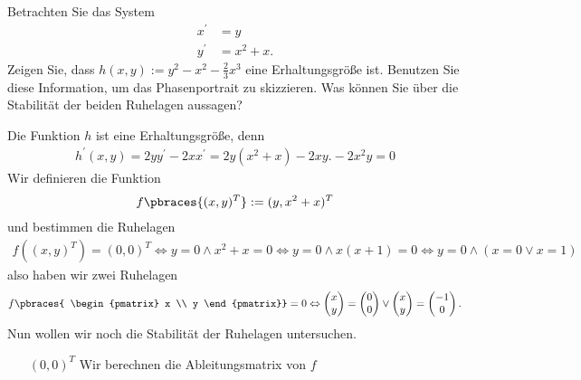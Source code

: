 \begin{exercise}
Betrachten Sie das System
\begin{align*}
  x^{\prime} &= y \\
  y^{\prime} &= x^2 + x.
\end{align*}
Zeigen Sie, dass $h(x,y) := y^2 - x^2 -\frac{2}{3}x^3$ eine Erhaltungsgröße ist.
Benutzen Sie diese Information, um das Phasenportrait zu skizzieren.
Was können Sie über die Stabilität der beiden Ruhelagen aussagen?
\end{exercise}
\begin{solution}
  Die Funktion $h$ ist eine Erhaltungsgröße, denn
  \begin{align*}
      h^\prime(x, y) = 2yy^\prime - 2xx^\prime = 2y(x^2 + x) - 2xy. -2x^2y = 0
  \end{align*}
  Wir definieren die Funktion
  \begin{align*}
    f\pbraces{(x, y)^T} := (y, x^2 + x)^T  
  \end{align*}
  und bestimmen die Ruhelagen 
  \begin{align*}
    f((x,y)^T) = (0, 0)^T \Leftrightarrow y = 0 \land x^2 + x = 0 \Leftrightarrow y = 0 \land x(x + 1) = 0 \Leftrightarrow y = 0 \land (x = 0 \lor x = 1)
  \end{align*}
  also haben wir zwei Ruhelagen 
  \begin{align*}
    f \pbraces{
    \begin{pmatrix}
      x \\ y
    \end{pmatrix}}
    = 0 \Leftrightarrow
    \begin{pmatrix}
      x \\ y
    \end{pmatrix}
    = 
    \begin{pmatrix}
      0 \\ 0
    \end{pmatrix} 
    \lor
    \begin{pmatrix}
      x \\ y
    \end{pmatrix}
    = 
    \begin{pmatrix}
      -1 \\ 0
    \end{pmatrix}.
  \end{align*}
  Nun wollen wir noch die Stabilität der Ruhelagen untersuchen.
  \begin{enumerate}
    \item[\glqq$(0, 0)^T$\grqq] Wir berechnen die Ableitungsmatrix von $f$

\end{enumerate}
\end{solution}
